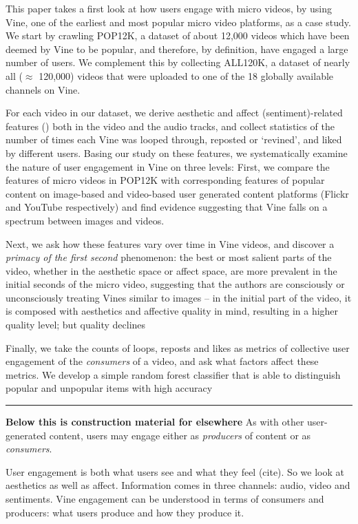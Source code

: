 This paper takes a first look at how users engage with micro videos, by using Vine, one of the earliest and most popular micro video platforms, as a case study. %
We start by crawling POP12K, a dataset of about 12,000 videos which have been deemed by Vine to be popular, and therefore, by definition, have engaged a large number of users. We complement this by collecting ALL120K, a dataset of nearly all ($\approx$ 120,000)  videos that were uploaded to one of the 18 globally available channels on Vine. 

For each video in our dataset, we derive  aesthetic and affect (sentiment)-related features () both in the video and the audio tracks, and collect statistics of the number of times each Vine was looped through, reposted or `revined', and liked by different users. Basing our study on these features, we systematically examine the nature of user engagement in Vine on three levels: First, we compare the features of micro videos in POP12K with corresponding features of popular content on image-based and video-based user generated content platforms (Flickr and YouTube respectively) and find evidence suggesting that Vine falls on a spectrum between images and videos. 

Next, we ask how these features vary over time in Vine videos, and discover a \emph{primacy of the first second} phenomenon: the best or most salient parts of the video, whether in the aesthetic space or affect space, are more prevalent in the initial seconds of the micro video, suggesting that the authors are consciously or unconsciously treating Vines similar to images -- in the initial part of the video, it is composed with aesthetics and affective quality in mind, resulting in a higher quality level; but quality declines 

Finally, we take the counts of loops, reposts and likes as metrics of collective user engagement of the \emph{consumers} of a video, and ask what factors affect these metrics. We develop a simple random forest classifier that is able to distinguish popular and unpopular items with high accuracy 

\hrule

\textbf{Below this is construction material for elsewhere}
As with other user-generated content, users may engage either as \emph{producers} of content or as \emph{consumers}. 

User engagement is both what users see and what they feel (cite). So we look at aesthetics as well as affect. Information comes in three channels: audio, video and sentiments. Vine engagement can be understood in terms of consumers and producers: what users produce and how they produce it. 


